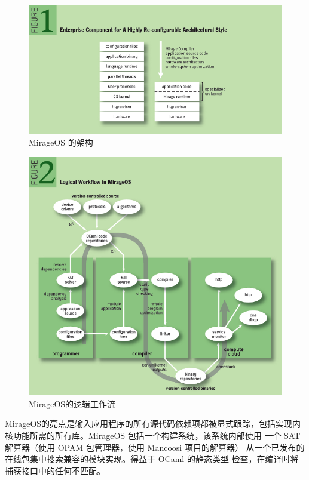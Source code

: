 \documentclass{../runikraft-report}
\begin{document}
\begin{figure}[!hbt]
\includegraphics[width=\linewidth]{../assets/figure1.png}
\caption{MirageOS 的架构}\label{fig:mirage-fig1}
\end{figure}

\begin{figure}[!hbt]
\includegraphics[width=\linewidth]{../assets/figure2.png}
\caption{MirageOS的逻辑工作流}\label{fig:mirage-fig2}
\end{figure}

MirageOS的亮点是输入应用程序的所有源代码依赖项都被显式跟踪，包括实现内
核功能所需的所有库。MirageOS 包括一个构建系统，该系统内部使用
一个 SAT 解算器（使用 OPAM 包管理器，使用 Mancoosi 项目的解算器）
从一个已发布的在线包集中搜索兼容的模块实现。得益于 OCaml 的静态类型
检查，在编译时将捕获接口中的任何不匹配。
\end{document}
